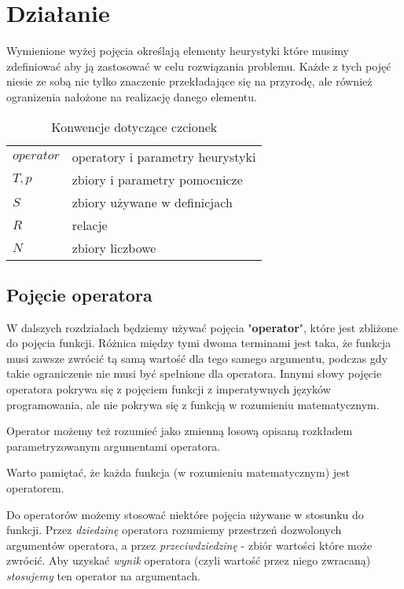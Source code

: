 \documentclass[twoside]{iisthesis}
\begin{document}
\section{Działanie}

Wymienione wyżej pojęcia określają elementy heurystyki które musimy zdefiniować aby ją zastosować w celu rozwiązania problemu. Każde z tych pojęć niesie ze sobą nie tylko znaczenie przekładające się na przyrodę, ale również ogranizenia nałożone na realizację danego elementu.

%

\begin{table}
	\caption{Konwencje dotyczące czcionek \label{table_conventions}}
	\begin{tabularx}{\linewidth}{lX}
		$operator$ & operatory i parametry heurystyki \\
		$T, p$ & zbiory i parametry pomocnicze \\
		$S$ & zbiory używane w definicjach \\
		$R$ & relacje \\
		$N$ & zbiory liczbowe
	\end{tabularx}
\end{table}

\subsection{Pojęcie operatora} \label{subsection_operator}

W dalszych rozdziałach będziemy używać pojęcia "\textbf{operator}", które jest zbliżone do pojęcia funkcji. Różnica między tymi dwoma terminami jest taka, że funkcja musi zawsze zwrócić tą samą wartość dla tego samego argumentu, podczas gdy takie ograniczenie nie musi być spełnione dla operatora. Innymi słowy pojęcie operatora pokrywa się z pojęciem funkcji z imperatywnych języków programowania, ale nie pokrywa się z funkcją w rozumieniu matematycznym.

Operator możemy też rozumieć jako zmienną losową opisaną rozkładem parametryzowanym argumentami operatora.

Warto pamiętać, że każda funkcja (w rozumieniu matematycznym) jest operatorem.

Do operatorów możemy stosować niektóre pojęcia używane w stosunku do funkcji. Przez \emph{dziedzinę} operatora rozumiemy przestrzeń dozwolonych argumentów operatora, a przez \emph{przeciwdziedzinę} - zbiór wartości które może zwrócić. Aby uzyskać \emph{wynik} operatora (czyli wartość przez niego zwracaną) \emph{stosujemy} ten operator na argumentach.
\end{document}
